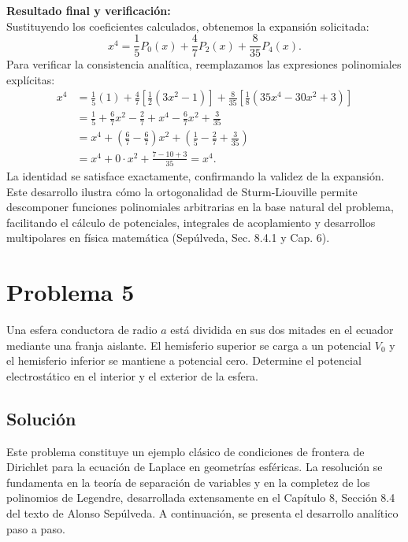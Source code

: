 \documentclass[a4paper]{article}
\begin{document}
\noindent\textbf{Resultado final y verificación:}\\
Sustituyendo los coeficientes calculados, obtenemos la expansión solicitada:
$$
x^4 = \frac{1}{5} P_0(x) + \frac{4}{7} P_2(x) + \frac{8}{35} P_4(x).
$$
Para verificar la consistencia analítica, reemplazamos las expresiones polinomiales explícitas:
$$
\begin{aligned}
x^4 &= \frac{1}{5}(1) + \frac{4}{7}\left[\frac{1}{2}(3x^2 - 1)\right] + \frac{8}{35}\left[\frac{1}{8}(35x^4 - 30x^2 + 3)\right] \\
&= \frac{1}{5} + \frac{6}{7}x^2 - \frac{2}{7} + x^4 - \frac{6}{7}x^2 + \frac{3}{35} \\
&= x^4 + \left(\frac{6}{7} - \frac{6}{7}\right)x^2 + \left(\frac{1}{5} - \frac{2}{7} + \frac{3}{35}\right) \\
&= x^4 + 0 \cdot x^2 + \frac{7 - 10 + 3}{35} = x^4.
\end{aligned}
$$
La identidad se satisface exactamente, confirmando la validez de la expansión. Este desarrollo ilustra cómo la ortogonalidad de Sturm-Liouville permite descomponer funciones polinomiales arbitrarias en la base natural del problema, facilitando el cálculo de potenciales, integrales de acoplamiento y desarrollos multipolares en física matemática (Sepúlveda, Sec. 8.4.1 y Cap. 6).



\section{Problema 5}
Una esfera conductora de radio $a$ está dividida en sus dos mitades en el ecuador mediante una franja aislante. El hemisferio superior se carga a un potencial $V_0$ y el hemisferio inferior se mantiene a potencial cero. Determine el potencial electrostático en el interior y el exterior de la esfera.

\subsection{Solución}
Este problema constituye un ejemplo clásico de condiciones de frontera de Dirichlet para la ecuación de Laplace en geometrías esféricas. La resolución se fundamenta en la teoría de separación de variables y en la completez de los polinomios de Legendre, desarrollada extensamente en el Capítulo 8, Sección 8.4 del texto de Alonso Sepúlveda. A continuación, se presenta el desarrollo analítico paso a paso.
\end{document}

